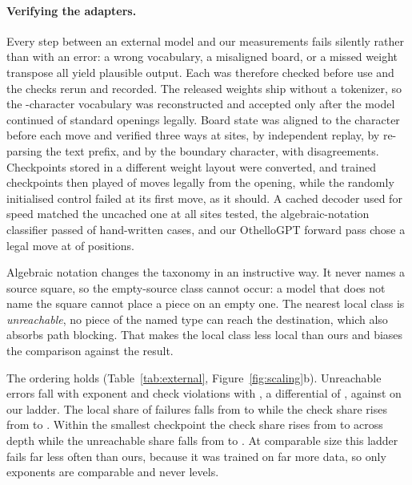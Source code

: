 \documentclass[11pt]{article}
\begin{document}
\paragraph{Verifying the adapters.}
Every step between an external model and our measurements fails silently rather
than with an error: a wrong vocabulary, a misaligned board, or a missed weight
transpose all yield plausible output. Each was therefore checked before use and
the checks rerun and recorded. The released weights ship without a tokenizer, so
the -character vocabulary was reconstructed and accepted only after
the model continued  of  standard openings
legally. Board state was aligned to the character before each move and verified
three ways at  sites, by independent replay, by re-parsing
the text prefix, and by the boundary character, with 
disagreements. Checkpoints stored in a different weight layout were converted, and
 trained checkpoints then played  of
 moves legally from the opening, while the randomly initialised
control failed at its first move, as it should. A cached decoder used for speed
matched the uncached one at all  sites tested, the
algebraic-notation classifier passed  of 
hand-written cases, and our OthelloGPT forward pass chose a legal move at
 of  positions.

Algebraic notation changes the taxonomy in an instructive way. It never names a
source square, so the empty-source class cannot occur: a model that does not name
the square cannot place a piece on an empty one. The nearest local class is
\emph{unreachable}, no piece of the named type can reach the destination, which
also absorbs path blocking. That makes the local class less local than ours and
biases the comparison against the result.

The ordering holds (Table~\ref{tab:external}, Figure~\ref{fig:scaling}b).
Unreachable errors fall with exponent  and check violations with
, a differential of , against  on
our ladder. The local share of failures falls from  to
 while the check share rises from  to
. Within the smallest checkpoint the check share rises from
 to  across depth while the unreachable
share falls from  to . At comparable size
this ladder fails far less often than ours, because it was trained on far more
data, so only exponents are comparable and never levels.
\end{document}
